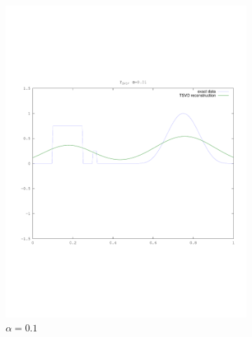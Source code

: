 \documentclass{article}
\begin{document}
\begin{figure}[!htb]
\begin{subfigure}[bh]{0.45\textwidth}
                \includegraphics[width=\textwidth]{plots/tsvd01.pdf}
                \caption{$\alpha=0.1$}
        \end{subfigure}%
        \begin{subfigure}[bh]{0.45\textwidth}

\end{subfigure}
\end{figure}
\end{document}
